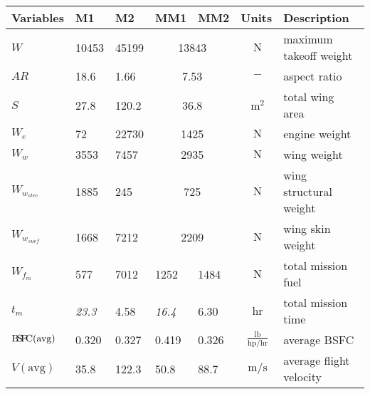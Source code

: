 \begin{footnotesize}
\begin{longtable}{lllllcl}
\toprule
Variables & M1 & M2 & MM1 & MM2 & Units & Description \\
\midrule
$W$ & 10453 & 45199 & \multicolumn{2}{c}{13843} & $~\mathrm{N}$ & maximum takeoff weight \\
$AR$ & 18.6 & 1.66 & \multicolumn{2}{c}{7.53} & $~\mathrm{-}$ & aspect ratio \\
$S$ & 27.8 & 120.2 & \multicolumn{2}{c}{36.8} & $~\mathrm{m^{2}}$ & total wing area \\
$W_e$ & 72 & 22730 & \multicolumn{2}{c}{1425} & $~\mathrm{N}$ & engine weight\\
$W_w$ & 3553 & 7457 & \multicolumn{2}{c}{2935} & $~\mathrm{N}$ & wing weight \\
$W_{w_{strc}}$ & 1885 & 245 & \multicolumn{2}{c}{725} & $~\mathrm{N}$ & wing structural weight\\
$W_{w_{surf}}$ & 1668 & 7212 & \multicolumn{2}{c}{2209} & $~\mathrm{N}$ & wing skin weight \\
$W_{f_m}$ & 577 & 7012 & 1252 & 1484 & $~\mathrm{N}$ & total mission fuel \\
$t_m$ & \textit{23.3} & 4.58 & \textit{16.4} & 6.30 & $~\mathrm{hr}$ & total mission time\\
${\rm B\!S\!F\!C} \mathrm{(avg)}$ & 0.320 & 0.327 & 0.419 & 0.326 & $~\mathrm{\frac{lb}{hp/hr}}$ & average BSFC \\
$V \mathrm{(avg)}$ & 35.8 & 122.3 & 50.8 & 88.7 & $~\mathrm{m/s}$ & average flight velocity \\
\bottomrule
\end{longtable}
\end{footnotesize}
